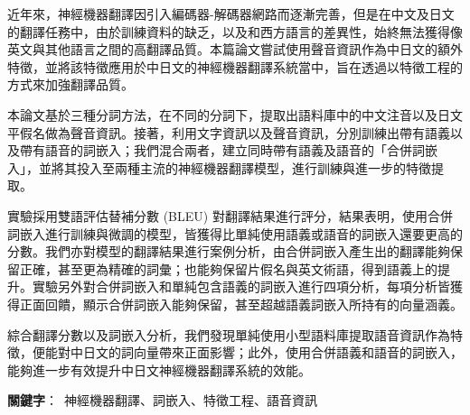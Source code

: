 近年來，神經機器翻譯因引入編碼器-解碼器網路而逐漸完善，但是在中文及日文的翻譯任務中，由於訓練資料的缺乏，以及和西方語言的差異性，始終無法獲得像英文與其他語言之間的高翻譯品質。本篇論文嘗試使用聲音資訊作為中日文的額外特徵，並將該特徵應用於中日文的神經機器翻譯系統當中，旨在透過以特徵工程的方式來加強翻譯品質。

本論文基於三種分詞方法，在不同的分詞下，提取出語料庫中的中文注音以及日文平假名做為聲音資訊。接著，利用文字資訊以及聲音資訊，分別訓練出帶有語義以及帶有語音的詞嵌入；我們混合兩者，建立同時帶有語義及語音的「合併詞嵌入」，並將其投入至兩種主流的神經機器翻譯模型，進行訓練與進一步的特徵提取。

實驗採用雙語評估替補分數 (BLEU) 對翻譯結果進行評分，結果表明，使用合併詞嵌入進行訓練與微調的模型，皆獲得比單純使用語義或語音的詞嵌入還要更高的分數。我們亦對模型的翻譯結果進行案例分析，由合併詞嵌入產生出的翻譯能夠保留正確，甚至更為精確的詞彙；也能夠保留片假名與英文術語，得到語義上的提升。實驗另外對合併詞嵌入和單純包含語義的詞嵌入進行四項分析，每項分析皆獲得正面回饋，顯示合併詞嵌入能夠保留，甚至超越語義詞嵌入所持有的向量涵義。

綜合翻譯分數以及詞嵌入分析，我們發現單純使用小型語料庫提取語音資訊作為特徵，便能對中日文的詞向量帶來正面影響；此外，使用合併語義和語音的詞嵌入，能夠進一步有效提升中日文神經機器翻譯系統的效能。

\begin{flushleft}
\mbox{{\bf 關鍵字}： 神經機器翻譯、詞嵌入、特徵工程、語音資訊}
\end{flushleft}